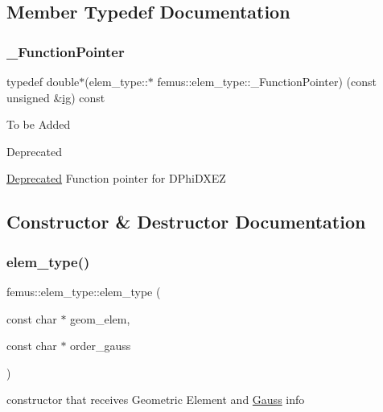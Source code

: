 \subsection{Member Typedef Documentation}
\mbox{\label{classfemus_1_1elem__type_ac6d3f8df5299550225a2f77c2aa15dde}} 
\subsubsection{\texorpdfstring{\+\_\+\+Function\+Pointer}{\_FunctionPointer}}
{\footnotesize\ttfamily typedef double$\ast$(elem\+\_\+type\+::$\ast$ femus\+::elem\+\_\+type\+::\+\_\+\+Function\+Pointer) (const unsigned \&\mbox{\hyperlink{namespacefemus_a6df31099f676311de214a312d7043941}{ig}}) const}

To be Added \begin{DoxyRefDesc}{Deprecated}
\item[\mbox{\hyperlink{deprecated__deprecated000015}{Deprecated}}]Function pointer for D\+Phi\+D\+X\+EZ \end{DoxyRefDesc}


\subsection{Constructor \& Destructor Documentation}
\mbox{\label{classfemus_1_1elem__type_aa2d116602d97b226a4a01578dd45bb20}} 
\subsubsection{\texorpdfstring{elem\+\_\+type()}{elem\_type()}}
{\footnotesize\ttfamily femus\+::elem\+\_\+type\+::elem\+\_\+type (\begin{DoxyParamCaption}\item[{const char $\ast$}]{geom\+\_\+elem,  }\item[{const char $\ast$}]{order\+\_\+gauss }\end{DoxyParamCaption})}

constructor that receives Geometric Element and \mbox{\hyperlink{classfemus_1_1_gauss}{Gauss}} info \mbox{\label{classfemus_1_1elem__type_a3e13560174d1ea0282665fbbf4eb605d}} 
